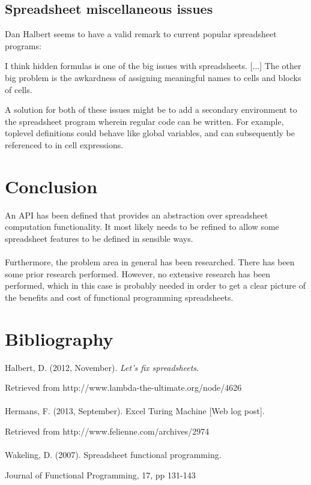\documentclass[10pt,a4paper]{article}
\begin{document}
\subsection{Spreadsheet miscellaneous issues}
\label{Spreadsheet miscellaneous issues}
Dan Halbert seems to have a valid remark to current popular spreadsheet programs:
\begin{displayquote}[Halbert, 2012]
I think hidden formulas is one of the big issues with spreadsheets. [...] The other big problem
is the awkardness of assigning meaningful names to cells and blocks of cells.
\end{displayquote}
A solution for both of these issues might be to add a secondary environment to the spreadsheet program
wherein regular code can be written. For example, toplevel definitions could behave like global
variables, and can subsequently be referenced to in cell expressions.

\clearpage
\section{Conclusion}
An API has been defined that provides an abstraction over spreadsheet computation functionality.
It most likely needs to be refined to allow some spreadsheet features to be defined in
sensible ways.
\\\\
Furthermore, the problem area in general has been researched. There has been some prior research
performed. However, no extensive research has been performed, which in this case is probably
needed in order to get a clear picture of the benefits and cost of functional programming spreadsheets.

\section*{Bibliography}
Halbert, D. (2012, November). \textit{Let's fix spreadsheets}.

Retrieved from http://www.lambda-the-ultimate.org/node/4626
\\\\
Hermans, F. (2013, September). Excel Turing Machine [Web log post].

Retrieved from http://www.felienne.com/archives/2974
\\\\
Wakeling, D. (2007). Spreadsheet functional programming.

Journal of Functional Programming, 17, pp 131-143
\end{document}
